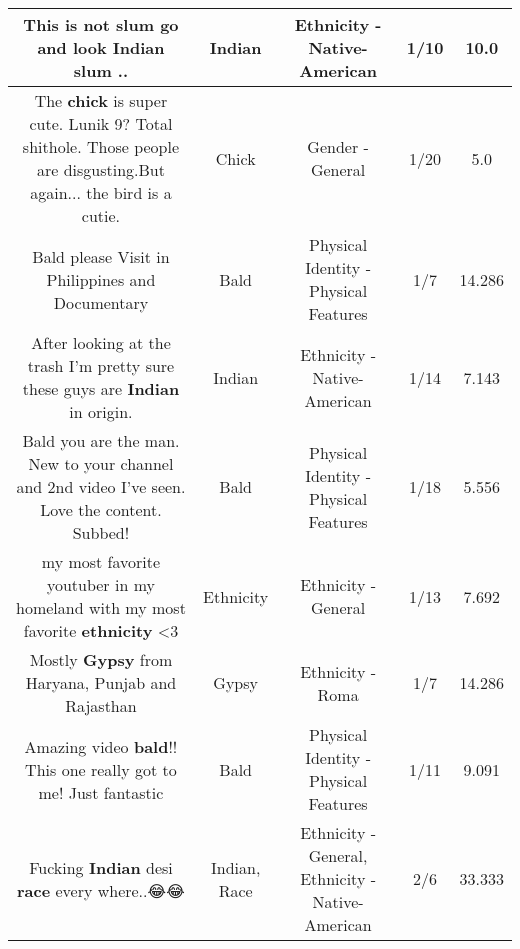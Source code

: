 \documentclass[11pt]{article}
\newlength\mylength
\begin{document}
\begin{center}
\begin{longtable}{|C{.65\mylength}|C{.30\mylength}|C{.12\mylength}|C{.12\mylength}|C{.12\mylength}|}
  \small This is not slum go and look \textbf{Indian} slum ..\normalsize   & Indian & Ethnicity - Native-American & 1/10 & 10.0 \\  \hline
  \small The \textbf{chick} is super cute. Lunik 9? Total shithole. Those people are disgusting.But again... the bird is a cutie.\normalsize   & Chick & Gender - General & 1/20 & 5.0 \\  \hline
  \small Bald please Visit in Philippines and Documentary\normalsize   & Bald & Physical Identity - Physical Features & 1/7 & 14.286 \\  \hline
  \small After looking at the trash I'm pretty sure these guys are \textbf{Indian} in origin.\normalsize   & Indian & Ethnicity - Native-American & 1/14 & 7.143 \\  \hline
  \small Bald you are the man. New to your channel and 2nd video I've seen. Love the content. Subbed!\normalsize   & Bald & Physical Identity - Physical Features & 1/18 & 5.556 \\  \hline
  \small my most favorite youtuber in my homeland with my most favorite \textbf{ethnicity} <3\normalsize   & Ethnicity & Ethnicity - General & 1/13 & 7.692 \\  \hline
  \small Mostly \textbf{Gypsy} from Haryana, Punjab and Rajasthan\normalsize   & Gypsy & Ethnicity - Roma & 1/7 & 14.286 \\  \hline
  \small Amazing video \textbf{bald}!! This one really got to me! Just fantastic\normalsize   & Bald & Physical Identity - Physical Features & 1/11 & 9.091 \\  \hline
  \small Fucking \textbf{Indian} desi \textbf{race} every where..😂😂\normalsize   & Indian, Race & Ethnicity - General, Ethnicity - Native-American & 2/6 & 33.333 \\  \hline

\end{longtable}
\end{center}
\end{document}
